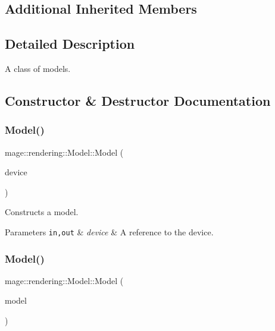 \subsection*{Additional Inherited Members}


\subsection{Detailed Description}
A class of models. 

\subsection{Constructor \& Destructor Documentation}
\mbox{\label{classmage_1_1rendering_1_1_model_a7f135a6ed7604655e94d3264bd9d5c62}} 
\subsubsection{\texorpdfstring{Model()}{Model()}\hspace{0.1cm}{\footnotesize\ttfamily [1/3]}}
{\footnotesize\ttfamily mage\+::rendering\+::\+Model\+::\+Model (\begin{DoxyParamCaption}\item[{I\+D3\+D11\+Device \&}]{device }\end{DoxyParamCaption})\hspace{0.3cm}{\ttfamily [explicit]}}

Constructs a model.


\begin{DoxyParams}[1]{Parameters}
\mbox{\tt in,out}  & {\em device} & A reference to the device. \\
\hline
\end{DoxyParams}
\mbox{\label{classmage_1_1rendering_1_1_model_a59a64dc710efaa44b9f256883d0ab9cb}} 
\subsubsection{\texorpdfstring{Model()}{Model()}\hspace{0.1cm}{\footnotesize\ttfamily [2/3]}}
{\footnotesize\ttfamily mage\+::rendering\+::\+Model\+::\+Model (\begin{DoxyParamCaption}\item[{const \mbox{\hyperlink{classmage_1_1rendering_1_1_model}{Model}} \&}]{model }\end{DoxyParamCaption})\hspace{0.3cm}{\ttfamily [delete]}}

